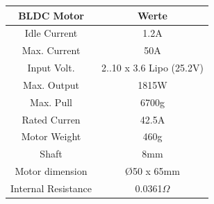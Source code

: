 \begin{center}
\begin{tabular}{|c|c|}
\hline 
\rule[-1ex]{0pt}{2.5ex}  BLDC Motor & Werte  \\ 
\hline 
\rule[-1ex]{0pt}{2.5ex} Idle Current & 1.2A \\ 
\hline 
\rule[-1ex]{0pt}{2.5ex} Max. Current & 50A \\ 
\hline
\rule[-1ex]{0pt}{2.5ex} Input Volt. & 2..10 x 3.6 Lipo (25.2V) \\ 
\hline
\rule[-1ex]{0pt}{2.5ex} Max. Output & 1815W \\ 
\hline
\rule[-1ex]{0pt}{2.5ex} Max. Pull & 6700g \\ 
\hline
\rule[-1ex]{0pt}{2.5ex} Rated Curren & 42.5A \\ 
\hline
\rule[-1ex]{0pt}{2.5ex} Motor Weight & 460g \\ 
\hline
\rule[-1ex]{0pt}{2.5ex} Shaft & 8mm \\ 
\hline
\rule[-1ex]{0pt}{2.5ex} Motor dimension & \O 50 x 65mm \\ 
\hline
\rule[-1ex]{0pt}{2.5ex} Internal Resistance & 0.0361$\Omega$ \\ 
\hline	
\end{tabular} 
\label{tabBLDCdaten}
\end{center}






